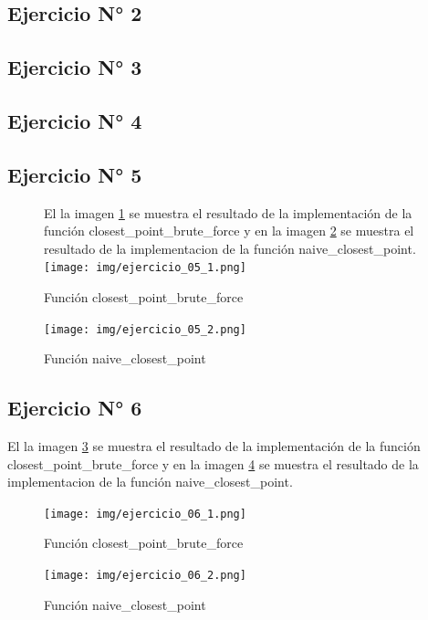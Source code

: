 \documentclass{article}
\begin{document}
\subsection{Ejercicio N° 2}
\subsection{Ejercicio N° 3}
\subsection{Ejercicio N° 4}
\subsection{Ejercicio N° 5}
\begin{figure}[h!]
El la imagen \ref{fig:ejercicio_05_1} se muestra el resultado de la implementación de la función closest_point_brute_force y en la imagen \ref{fig:ejercicio_05_2} se muestra el resultado de la implementacion de la función naive_closest_point.
	\centering
	\texttt{[image: img/ejercicio\_05\_1.png]}
	\caption{Función closest_point_brute_force}
	\label{fig:ejercicio_05_1}
\end{figure}

\begin{figure}[h!]
	\centering
	\texttt{[image: img/ejercicio\_05\_2.png]}
	\caption{Función naive_closest_point}
	\label{fig:ejercicio_05_2}
\end{figure}

\subsection{Ejercicio N° 6}
El la imagen \ref{fig:ejercicio_06_1} se muestra el resultado de la implementación de la función closest_point_brute_force y en la imagen \ref{fig:ejercicio_06_2} se muestra el resultado de la implementacion de la función naive_closest_point.
\begin{figure}[h!]
	\centering
	\texttt{[image: img/ejercicio\_06\_1.png]}
	\caption{Función closest_point_brute_force}
	\label{fig:ejercicio_06_1}
\end{figure}

\begin{figure}[h!]
	\centering
	\texttt{[image: img/ejercicio\_06\_2.png]}
	\caption{Función naive_closest_point}
	\label{fig:ejercicio_06_2}
\end{figure}
\end{document}
